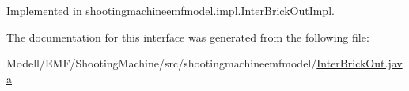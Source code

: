 Implemented in \hyperlink{classshootingmachineemfmodel_1_1impl_1_1_inter_brick_out_impl_a70830c8c8849ce8ecb75e843b3ed8c1c}{shootingmachineemfmodel.\-impl.\-Inter\-Brick\-Out\-Impl}.



The documentation for this interface was generated from the following file\-:\begin{DoxyCompactItemize}
\item 
Modell/\-E\-M\-F/\-Shooting\-Machine/src/shootingmachineemfmodel/\hyperlink{_inter_brick_out_8java}{Inter\-Brick\-Out.\-java}\end{DoxyCompactItemize}
